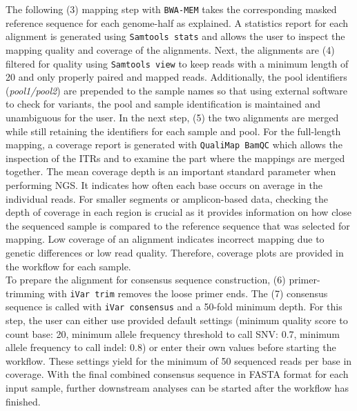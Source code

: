 The following (3) mapping step with \texttt{BWA-MEM} takes the corresponding masked reference sequence for each genome-half as explained. A statistics report for each alignment is generated using \texttt{Samtools stats} and allows the user to inspect the mapping quality and coverage of the alignments. Next, the alignments are (4) filtered for quality using \texttt{Samtools view} to keep reads with a minimum length of 20 and only properly paired and mapped reads. Additionally, the pool identifiers (\textit{pool1/pool2}) are prepended to the sample names so that using external software to check for variants, the pool and sample identification is maintained and unambiguous for the user. In the next step, (5) the two alignments are merged while still retaining the identifiers for each sample and pool. For the full-length mapping, a coverage report is generated with \texttt{QualiMap BamQC} which allows the inspection of the \acp{ITR} and to examine the part where the mappings are merged together. The mean coverage depth is an important standard parameter when performing \ac{NGS}. It indicates how often each base occurs on average in the individual reads. For smaller segments or amplicon-based data, checking the depth of coverage in each region is crucial as it provides information on how close the sequenced sample is compared to the reference sequence that was selected for mapping. Low coverage of an alignment indicates incorrect mapping due to genetic differences or low read quality. Therefore, coverage plots are provided in the workflow for each sample.\\
To prepare the alignment for consensus sequence construction, (6) primer-trimming with \texttt{iVar trim} removes the loose primer ends. The (7) consensus sequence is called with \texttt{iVar consensus} and a 50-fold minimum depth. For this step, the user can either use provided default settings (minimum quality score to count base: 20, minimum allele frequency threshold to call \ac{SNV}: 0.7, minimum allele frequency to call indel: 0.8) or enter their own values before starting the workflow. These settings yield for the minimum of 50 sequenced reads per base in coverage. With the final combined consensus sequence in FASTA format for each input sample, further downstream analyses can be started after the workflow has finished.

